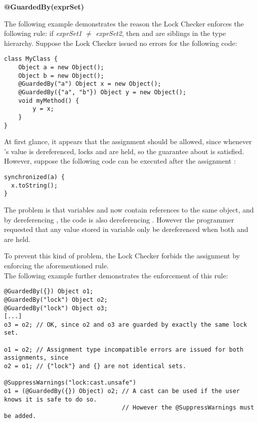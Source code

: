 \textbf{@GuardedBy(exprSet)}

The following example demonstrates the reason the Lock Checker enforces the
following rule:  if \emph{exprSet1} $\neq$ \emph{exprSet2}, then
 and  are siblings in the type
hierarchy.  Suppose the Lock Checker issued no errors for the following code:

\begin{Verbatim}
class MyClass {
    Object a = new Object();
    Object b = new Object();
    @GuardedBy("a") Object x = new Object();
    @GuardedBy({"a", "b"}) Object y = new Object();
    void myMethod() {
        y = x;
    }
}
\end{Verbatim}

At first glance, it appears that the assignment should be allowed, since
whenever 's value is dereferenced, locks  and  are
held, so the guarantee about  is satisfied.  However, suppose the
following code can be executed after the assignment :

\begin{Verbatim}
synchronized(a) {
  x.toString();
}
\end{Verbatim}

The problem is that variables  and  now contain references to
the same object, and by dereferencing , the code is also dereferencing
.  However the programmer requested that any value stored in variable
 only be dereferenced when both  and  are held.

To prevent this kind of problem, the Lock Checker forbids the assignment
 by enforcing the aforementioned rule.
\\

The following example further demonstrates the enforcement of this rule:

\begin{Verbatim}
@GuardedBy({}) Object o1;
@GuardedBy("lock") Object o2;
@GuardedBy("lock") Object o3;
[...]
o3 = o2; // OK, since o2 and o3 are guarded by exactly the same lock set.

o1 = o2; // Assignment type incompatible errors are issued for both assignments, since
o2 = o1; // {"lock"} and {} are not identical sets.

@SuppressWarnings("lock:cast.unsafe")
o1 = (@GuardedBy({}) Object) o2; // A cast can be used if the user knows it is safe to do so.
                                 // However the @SuppressWarnings must be added.
\end{Verbatim}





